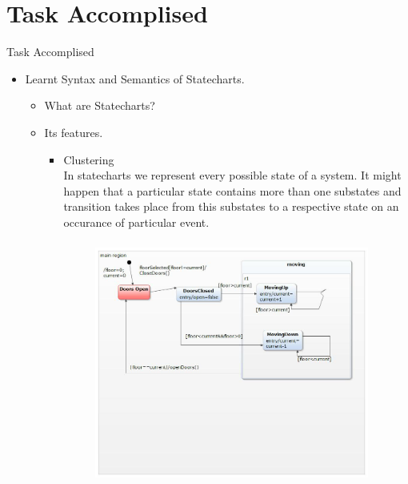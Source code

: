 \documentclass[10pt, a4paper]{beamer}
\begin{document}
\section{Task Accomplised}
\begin{frame}{Task Accomplised}
    \begin{itemize}
        \item Learnt Syntax and Semantics of Statecharts.
            \begin{itemize}
            \item What are Statecharts?
            \item Its features.
            \begin{itemize}
                \item Clustering \\
                In statecharts we represent every possible state of a system. It might happen that a particular state contains more than one substates and transition takes place from this substates to a respective state on an occurance of particular event.\\
                \begin{figure}[h]
                \centering
                \includegraphics[width=9cm,height=8cm]{elevator.jpg}
                \end{figure}
                \end{itemize}
                \end{itemize}
                \end{itemize}
                \end{frame}
\end{document}
